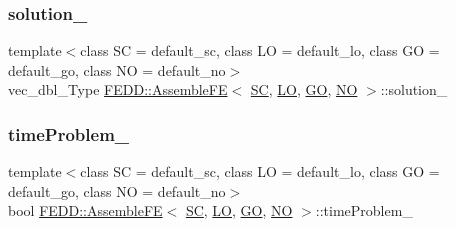 \subsubsection{\texorpdfstring{solution\+\_\+}{solution\_}}
{\footnotesize\ttfamily template$<$class SC  = default\+\_\+sc, class LO  = default\+\_\+lo, class GO  = default\+\_\+go, class NO  = default\+\_\+no$>$ \\
vec\+\_\+dbl\+\_\+\+Type \hyperlink{classFEDD_1_1AssembleFE}{F\+E\+D\+D\+::\+Assemble\+FE}$<$ \hyperlink{fe__test__laplace_8cpp_a79c7e86a57edbb2a5a53242bcd04e41e}{SC}, \hyperlink{fe__test__laplace_8cpp_ad6a38c9f07d3fd633eefca5bccad8410}{LO}, \hyperlink{fe__test__laplace_8cpp_afa2946b509009b4f45eb04bd8c5b27d9}{GO}, \hyperlink{fe__test__laplace_8cpp_a5e24f37b28787429872b6ecb1d0417ce}{NO} $>$\+::solution\+\_\+\hspace{0.3cm}{\ttfamily [protected]}}

\mbox{\label{classFEDD_1_1AssembleFE_aaa84c5ca06ca8dcd1ad82d7d66ac8e4c}} 
\subsubsection{\texorpdfstring{time\+Problem\+\_\+}{timeProblem\_}}
{\footnotesize\ttfamily template$<$class SC  = default\+\_\+sc, class LO  = default\+\_\+lo, class GO  = default\+\_\+go, class NO  = default\+\_\+no$>$ \\
bool \hyperlink{classFEDD_1_1AssembleFE}{F\+E\+D\+D\+::\+Assemble\+FE}$<$ \hyperlink{fe__test__laplace_8cpp_a79c7e86a57edbb2a5a53242bcd04e41e}{SC}, \hyperlink{fe__test__laplace_8cpp_ad6a38c9f07d3fd633eefca5bccad8410}{LO}, \hyperlink{fe__test__laplace_8cpp_afa2946b509009b4f45eb04bd8c5b27d9}{GO}, \hyperlink{fe__test__laplace_8cpp_a5e24f37b28787429872b6ecb1d0417ce}{NO} $>$\+::time\+Problem\+\_\+\hspace{0.3cm}{\ttfamily [protected]}}

\mbox{\label{classFEDD_1_1AssembleFE_aedef52d32fc32f3b70877f705968afcc}} 
